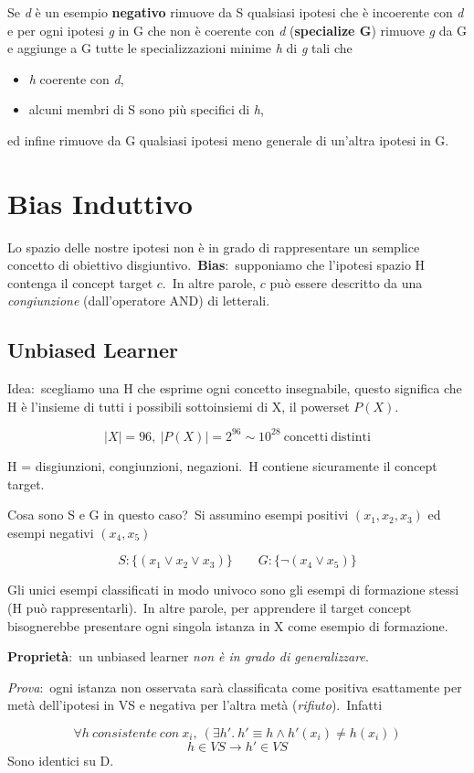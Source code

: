 Se \textit{d} è un esempio \textbf{negativo} rimuove da S qualsiasi ipotesi che è incoerente con \textit{d} e per ogni ipotesi \textit{g} in G che non è coerente con \textit{d} (\textbf{specialize G}) rimuove \textit{g} da G e aggiunge a G tutte le specializzazioni minime \textit{h} di \textit{g} tali che
\begin{itemize}
	\item \textit{h} coerente con \textit{d},
	\item alcuni membri di S sono più specifici di \textit{h},
\end{itemize}
ed infine rimuove da G qualsiasi ipotesi meno generale di un'altra ipotesi in G.\

\section{Bias Induttivo}

Lo spazio delle nostre ipotesi non è in grado di rappresentare un semplice concetto di obiettivo disgiuntivo.\
\textbf{Bias}:\ supponiamo che l'ipotesi spazio H contenga il concept target $c$.\
In altre parole, $c$ può essere descritto da una \textit{congiunzione} (dall'operatore AND) di letterali.

\subsection{Unbiased Learner}

Idea:\ scegliamo una H che esprime ogni concetto insegnabile, questo significa che H è l'insieme di tutti i possibili sottoinsiemi di X, il powerset $P(X)$.\

\[ |X| = 96,\ |P(X)|=2^{96} \sim 10^{28}\ \mathrm{concetti\ distinti}  \]

\noindent H = disgiunzioni, congiunzioni, negazioni.\
H contiene sicuramente il concept target.

Cosa sono S e G in questo caso?\
Si assumino esempi positivi $(x_1, x_2, x_3)$ ed esempi negativi $(x_4, x_5)$

\[
	S: \{(x_1 \lor x_2 \lor x_3)\}\qquad G: \{\lnot(x_4 \lor x_5)\}
\]

\noindent Gli unici esempi classificati in modo univoco sono gli esempi di formazione stessi (H può rappresentarli).\
In altre parole, per apprendere il target concept bisognerebbe presentare ogni singola istanza in X come esempio di formazione.\

\begin{flushleft}
	\textbf{Proprietà}:\ un unbiased learner \textit{non è in grado di generalizzare}.\

	\textit{Prova}:\ ogni istanza non osservata sarà classificata come positiva esattamente per metà dell'ipotesi in VS e negativa per l'altra metà (\textit{rifiuto}).\
	Infatti

	\[
		\forall h\ consistente\ con\ x_i,\ (\exists h'.\ h' \equiv h \land h'(x_i) \neq h(x_i))
	\]
	\[
		h \in \mathit{VS} \rightarrow h' \in \mathit{VS}
	\]
	Sono identici su D.\
\end{flushleft}

